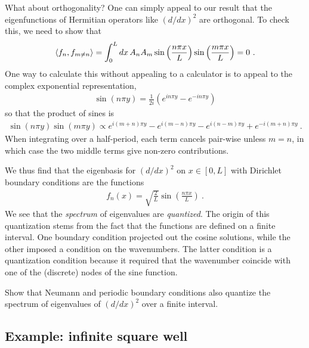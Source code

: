 What about orthogonality? One can simply appeal to our result that the eigenfunctions of Hermitian operators like $(d/dx)^2$ are orthogonal. To check this, we need to show that
\begin{align}
    \langle f_n, f_{m\neq n}\rangle 
    = \int_0^L dx\, A_nA_m 
    \sin\left(\frac{n\pi x}{L}\right)
    \sin\left(\frac{m\pi x}{L}\right)
    = 0 \ .
\end{align}
One way to calculate this without appealing to a calculator is to appeal to the complex exponential representation,
\begin{align}
    \sin(n\pi y) = \frac{1}{2i}\left(e^{in\pi y} - e^{-in\pi y}\right)
\end{align}
so that the product of sines is
\begin{align}
    \sin(n\pi y)\sin(m\pi y)
    \propto 
    e^{i(m+n)\pi y} - e^{i(m-n)\pi y} - e^{i(n-m)\pi y} + e^{-i(m+n)\pi y} \ .
\end{align}
When integrating over a half-period, each term cancels pair-wise unless  $m=n$, in which case the two middle terms give non-zero contributions. 


We thus find that the eigenbasis for $(d/dx)^2$ on $x\in [0,L]$ with Dirichlet boundary conditions are the functions
\begin{align}
    f_n(x) = \sqrt{\frac{2}{L}}\sin\left(\frac{n\pi x}{L}\right) \ .
\end{align}
We see that the \emph{spectrum} of eigenvalues are \emph{quantized}. The origin of this quantization stems from the fact that the functions are defined on a finite interval. One boundary condition projected out the cosine solutions, while the other imposed a condition on the wavenumbers. The latter condition is a quantization condition because it required that the wavenumber coincide with one of the (discrete) nodes of the sine function.

\begin{exercise}
Show that Neumann and periodic boundary conditions also quantize the spectrum of eigenvalues of $(d/dx)^2$ over a finite interval.
\end{exercise}




\subsection{Example: infinite square well}

